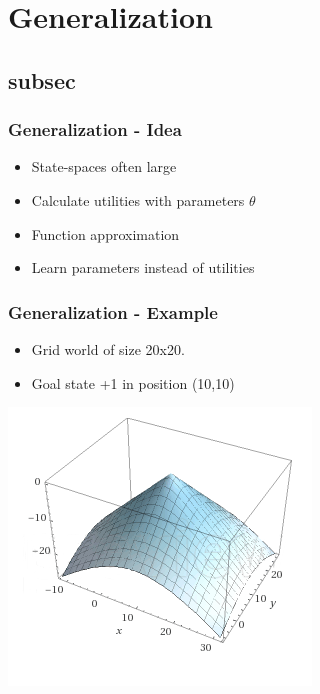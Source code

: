 
\section{Generalization} 
\subsection{subsec} %

\begin{frame}
    \frametitle{Generalization - Idea}
    \begin{itemize}
    	\item State-spaces often large
    	\item Calculate utilities with parameters $\theta$
    	\item Function approximation
    	\item Learn parameters instead of utilities
	\end{itemize}
	
\end{frame}

\begin{frame}
    \frametitle{Generalization - Example}
    \begin{itemize}
    	\item Grid world of size 20x20.
    	\item Goal state +1 in position (10,10)
	\end{itemize}

	
	\begin{center}
		\includegraphics[width=0.4\linewidth]{img-michael/generalization_cone.png}
	\end{center}
\end{frame}

